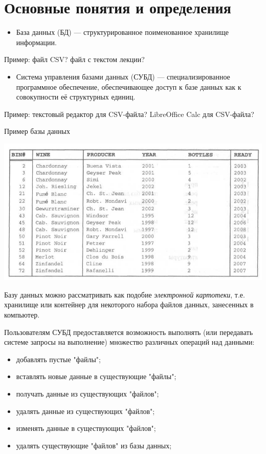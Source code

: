\documentclass{beamer}
\begin{document}
\section{Основные понятия и определения}
\begin{frame}
\begin{itemize}
\item База данных (БД) — структурированное поименованное хранилище информации.
\end{itemize}
Пример: файл CSV? файл с текстом лекции?
\begin{itemize}
\item Система управления базами данных (СУБД) — специализированное программное обеспечение, обеспечивающее доступ к базе данных как к совокупности её структурных единиц.
\end{itemize}
Пример: текстовый редактор для CSV-файла? LibreOffice Calc для CSV-файла?
\end{frame} 

\begin{frame}
\begin{block}{Пример базы данных}
\begin{center}
\includegraphics[scale=0.5]{images/example-01.png}
\end{center}
\end{block}
\end{frame} 

\begin{frame}
Базу данных можно рассматривать как подобие \textit{электронной картотеки}, т.е. хранилище или контейнер для некоторого набора файлов данных, занесенных в компьютер.

Пользователям СУБД предоставляется возможность выполнять (или передавать системе запросы на выполнение) множество различных операций над данными:
\begin{itemize}
\item добавлять пустые "файлы";
\item вставлять новые данные в существующие "файлы";
\item получать данные из существующих "файлов";
\item удалять данные из существующих "файлов";
\item изменять данные в существующих "файлов";
\item удалять существующие "файлов" из базы данных;
\end{itemize}
\end{frame}
\end{document}
